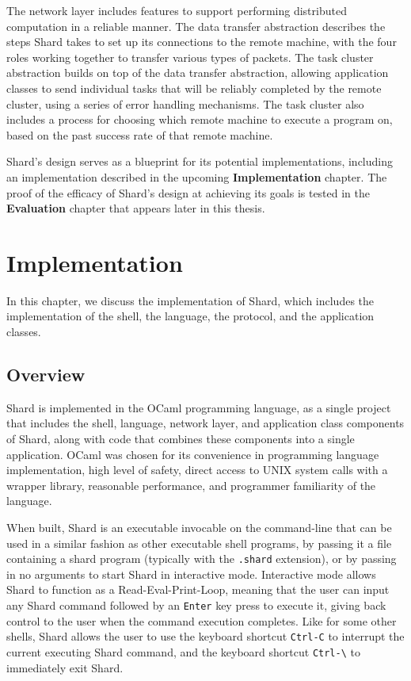 \documentclass[oneside]{report}
\begin{document}
The network layer includes features to support performing distributed computation in a reliable manner.
The data transfer abstraction describes the steps Shard takes to set up its connections to the remote machine, with the four roles working together to transfer various types of packets.
The task cluster abstraction builds on top of the data transfer abstraction, allowing application classes to send individual tasks that will be reliably completed by the remote cluster, using a series of error handling mechanisms.
The task cluster also includes a process for choosing which remote machine to execute a program on, based on the past success rate of that remote machine.

Shard's design serves as a blueprint for its potential implementations, including an implementation described in the upcoming \textbf{Implementation} chapter.
The proof of the efficacy of Shard's design at achieving its goals is tested in the \textbf{Evaluation} chapter that appears later in this thesis.


\chapter{Implementation}

In this chapter, we discuss the implementation of Shard, which includes the implementation of the shell, the language, the protocol, and the application classes.

\section{Overview}

Shard is implemented in the OCaml programming language, as a single project that includes the shell, language, network layer, and application class components of Shard, along with code that combines these components into a single application.
OCaml was chosen for its convenience in programming language implementation, high level of safety, direct access to UNIX system calls with a wrapper library, reasonable performance, and programmer familiarity of the language.

When built, Shard is an executable invocable on the command-line that can be used in a similar fashion as other executable shell programs, by passing it a file containing a shard program (typically with the \texttt{.shard} extension), or by passing in no arguments to start Shard in interactive mode.
Interactive mode allows Shard to function as a Read-Eval-Print-Loop, meaning that the user can input any Shard command followed by an \texttt{Enter} key press to execute it, giving back control to the user when the command execution completes.
Like for some other shells, Shard allows the user to use the keyboard shortcut \texttt{Ctrl-C} to interrupt the current executing Shard command, and the keyboard shortcut \texttt{Ctrl-\textbackslash} to immediately exit Shard.
\end{document}
